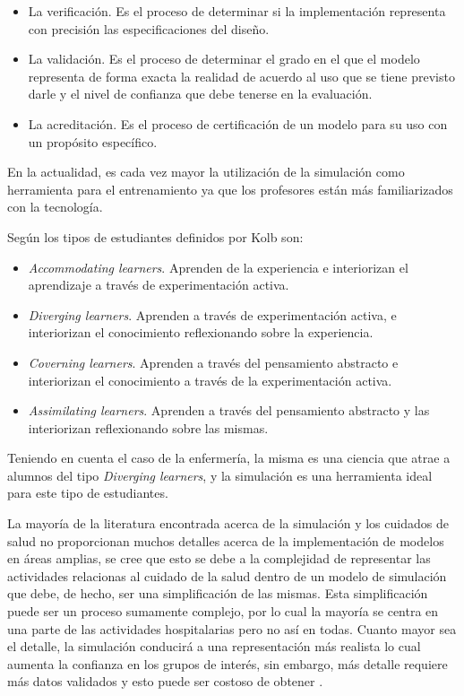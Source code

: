 \begin{itemize}

\item La verificación. Es el proceso de determinar si la implementación representa con precisión las especificaciones del diseño. 

\item La validación. Es el proceso de determinar el grado en el que el modelo representa de forma exacta la realidad de acuerdo al uso que se tiene previsto darle y el nivel de confianza que debe tenerse en la evaluación.

\item La acreditación. Es el proceso de certificación de un modelo para su uso con un propósito específico.


\end{itemize}

En la actualidad, es cada vez mayor la utilización de la simulación como herramienta para el entrenamiento ya que los profesores están más familiarizados con la tecnología. 

Según \cite{humphreys2013developing} los tipos de estudiantes definidos por Kolb son:

\begin{itemize}

\item  \emph{Accommodating learners}. Aprenden de la experiencia e interiorizan el aprendizaje a través de experimentación activa.
\item \emph{Diverging learners}. Aprenden a través de experimentación activa, e interiorizan el conocimiento reflexionando sobre la experiencia.
\item \emph{Coverning learners}. Aprenden a través del pensamiento abstracto e interiorizan el conocimiento a través de la experimentación activa.
\item \emph {Assimilating learners}. Aprenden a través del pensamiento abstracto y las interiorizan reflexionando sobre las mismas.
\end{itemize}

Teniendo en cuenta el caso de la enfermería, la misma es una ciencia que atrae a alumnos del tipo \emph{Diverging learners}, y la simulación es una herramienta ideal para este tipo de estudiantes.

La mayoría de la literatura encontrada acerca de la simulación y los cuidados de salud no proporcionan muchos detalles acerca de la implementación de modelos en áreas amplias, se cree que esto se debe a la complejidad de representar las actividades relacionas al cuidado de la salud dentro de un modelo de simulación que debe, de hecho, ser una simplificación de las mismas. Esta simplificación puede ser un proceso sumamente complejo, por lo cual la mayoría se centra en una parte de las actividades hospitalarias pero no así en todas. Cuanto mayor sea el detalle, la simulación conducirá a una representación más realista lo cual aumenta la confianza en los grupos de interés, sin embargo, más detalle requiere más datos validados y esto puede ser costoso de obtener \cite{guna:simulation}.

